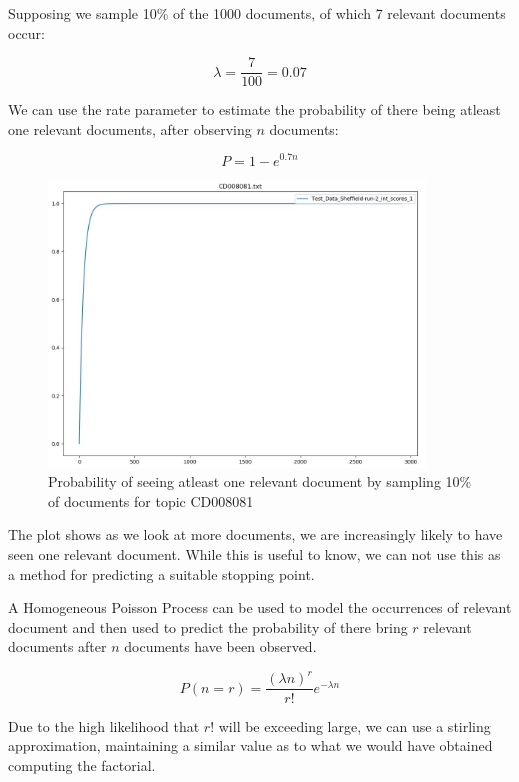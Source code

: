 Supposing we sample 10\% of the 1000 documents, of which 7 relevant documents occur:

\begin{equation}
	  \lambda = \frac{7}{100} = 0.07
\end{equation}

We can use the rate parameter to estimate the probability of there being atleast one relevant documents, after observing $n$ documents:

\begin{equation}
	  P = 1 - e ^ {0.7n}
\end{equation}


\begin{figure}[H]
\center
\includegraphics[width=10cm]{figures/probOneDoc.jpg}
\caption{Probability of seeing atleast one relevant document by sampling 10\% of documents for topic CD008081}
\end{figure}

The plot shows as we look at more documents, we are increasingly likely to have seen one relevant document. While this is useful to know, we can not use this as a method for predicting a suitable stopping point.

A Homogeneous Poisson Process can be used to model the occurrences of relevant document and then used to predict the probability of there bring $r$ relevant documents after $n$ documents have been observed. 

\begin{equation}
	  P(n = r) = \frac{(\lambda n)^r}{r!} e ^ {-\lambda n}
\end{equation}


Due to the high likelihood that $r!$ will be exceeding large, we can use a stirling approximation, maintaining a similar value as to what we would have obtained computing the factorial.

